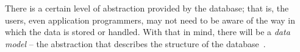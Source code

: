 




There is a certain level of abstraction provided by the database; that is, the users, even application programmers, may not need to be aware of the way in which the data is stored or handled. With that in mind, there will be a \textit{data model} -- the abstraction that describes the structure of the database~\cite{fds}. 




